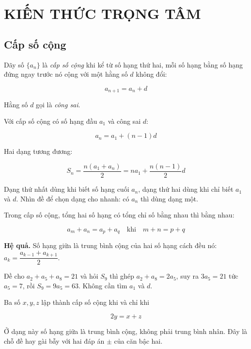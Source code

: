 \documentclass[11pt, a4paper]{article}
\begin{document}
\section{KIẾN THỨC TRỌNG TÂM}

\subsection{Cấp số cộng}

\begin{dinhnghia}
Dãy số $\{a_n\}$ là \emph{cấp số cộng} khi kể từ số hạng thứ hai, mỗi số hạng bằng số hạng đứng ngay trước nó cộng với một hằng số $d$ không đổi:

$$a_{n+1} = a_n + d$$

Hằng số $d$ gọi là \emph{công sai}.
\end{dinhnghia}
\begin{dinhly}
Với cấp số cộng có số hạng đầu $a_1$ và công sai $d$:

$$a_n = a_1 + (n - 1)d$$
\end{dinhly}
\begin{dinhly}
Hai dạng tương đương:

$$S_n = \frac{n(a_1 + a_n)}{2} = na_1 + \frac{n(n-1)}{2}d$$

 Dạng thứ nhất dùng khi biết số hạng cuối $a_n$, dạng thứ hai dùng khi chỉ biết $a_1$ và $d$. Nhìn đề để chọn dạng cho nhanh: có $a_n$ thì dùng dạng một.
\end{dinhly}
\begin{dinhly}
Trong cấp số cộng, tổng hai số hạng có tổng chỉ số bằng nhau thì bằng nhau:

$$a_m + a_n = a_p + a_q \quad \text{khi} \quad m + n = p + q$$

\textbf{Hệ quả.} Số hạng giữa là trung bình cộng của hai số hạng cách đều nó: $a_k = \dfrac{a_{k-1} + a_{k+1}}{2}$.

 Đề cho $a_2 + a_5 + a_8 = 21$ và hỏi $S_9$ thì ghép $a_2 + a_8 = 2a_5$, suy ra $3a_5 = 21$ tức $a_5 = 7$, rồi $S_9 = 9a_5 = 63$. Không cần tìm $a_1$ và $d$.
\end{dinhly}
\begin{dinhly}
Ba số $x, y, z$ lập thành cấp số cộng khi và chỉ khi

$$2y = x + z$$

 Ở dạng này số hạng giữa là trung bình cộng, không phải trung bình nhân. Đây là chỗ đề hay gài bẫy với hai đáp án $\pm$ của căn bậc hai.
\end{dinhly}
\end{document}
